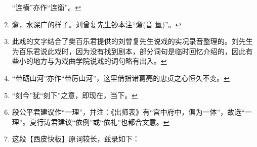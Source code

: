 \begin{enumerate}
  ``连横''亦作``连衡''。\protect\hyperlink{fnref274}{↩}
\item
  \leavevmode\hypertarget{fn275}{}%
  奫，水深广的样子。刘曾复先生钞本注``奫(音
  氲)''。\protect\hyperlink{fnref275}{↩}
\item
  \leavevmode\hypertarget{fn276}{}%
  此戏的文字结合了樊百乐君提供的刘曾复先生说戏的实况录音整理的。刘先生为百乐君说此戏时，因为没有找到剧本，部分词句是临时回忆介绍的，因此有些小的地方与为戏曲学院说戏的词句略有出入。\protect\hyperlink{fnref276}{↩}
\item
  \leavevmode\hypertarget{fn277}{}%
  ``带砺山河''亦作``带厉山河''，这里借指诸葛亮的忠贞之心恒久不变。\protect\hyperlink{fnref277}{↩}
\item
  \leavevmode\hypertarget{fn278}{}%
  ``刻今''犹``刻下''之意，即现在，当下。\protect\hyperlink{fnref278}{↩}
\item
  \leavevmode\hypertarget{fn279}{}%
  段公平君建议作``一理''，并注：《出师表》有``宫中府中，俱为一体''，故选``一理''。夏行涛君建议``依例''或``依礼''也都合文意。\protect\hyperlink{fnref279}{↩}
\item
  \leavevmode\hypertarget{fn280}{}%
  这段【西皮快板】原词较长，兹录如下：


\end{enumerate}
